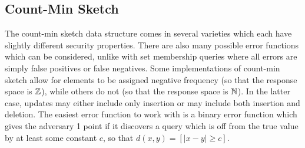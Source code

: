 \subsection{Count-Min Sketch}



The count-min sketch data structure comes in several varieties which each have slightly different security properties. There are also many possible error functions which can be considered, unlike with set membership queries where all errors are simply false positives or false negatives. Some implementations of count-min sketch allow for elements to be assigned negative frequency (so that the response space is $\mathbb{Z}$), while others do not (so that the response space is $\mathbb{N}$). In the latter case, updates may either include only insertion or may include both insertion and deletion. The easiest error function to work with is a binary error function which gives the adversary 1 point if it discovers a query which is off from the true value by at least some constant $c$, so that $d(x,y) = [|x - y| \ge c]$.


